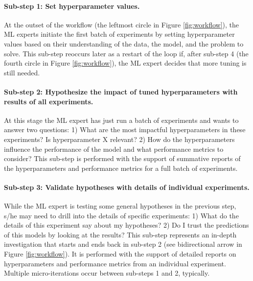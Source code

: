 \documentclass[preprint]{vgtc}        %
\begin{document}
\paragraph{Sub-step 1: Set hyperparameter values.} At the outset of the workflow (the leftmost circle in Figure \ref{fig:workflow}), the ML experts initiate the first batch of experiments by setting hyperparameter values based on their understanding of the data, the model, and the problem to solve. This sub-step reoccurs later as a restart of the loop if, after sub-step 4 (the fourth circle in Figure \ref{fig:workflow}), the ML expert decides that more tuning is still needed. 

\paragraph{Sub-step 2: Hypothesize the impact of tuned hyperparameters with results of all experiments.} At this stage the ML expert has just run a batch of experiments and wants to answer two questions: 1) What are the most impactful hyperparameters in these experiments? Is hyperparameter X relevant?
2) How do the hyperparameters influence the performance of the model and what performance metrics to consider? 
This sub-step is performed with the support of summative reports of the hyperparameters and performance metrics for a full batch of experiments.

\paragraph{Sub-step 3: Validate hypotheses with details of individual experiments.} While the ML expert is testing some general hypotheses in the previous step, s/he may need to drill into the details of specific experiments: 
1) What do the details of this experiment say about my hypotheses? 2) Do I trust the predictions of this models by looking at the results?
This sub-step represents an in-depth investigation that starts and ends back in sub-step 2 (see bidirectional arrow in Figure \ref{fig:workflow}). It is performed with the support of detailed reports on hyperparameters and performance metrics from an individual experiment. Multiple micro-iterations occur between sub-steps 1 and 2, typically.
\end{document}
